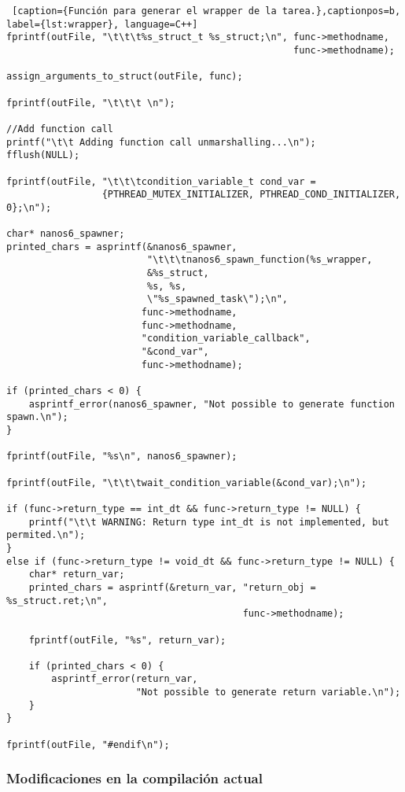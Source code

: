 \begin{lstlisting} [caption={Función para generar el wrapper de la tarea.},captionpos=b, label={lst:wrapper}, language=C++]
fprintf(outFile, "\t\t\t%s_struct_t %s_struct;\n", func->methodname, 
				 								   func->methodname);

assign_arguments_to_struct(outFile, func);

fprintf(outFile, "\t\t\t \n");

//Add function call
printf("\t\t Adding function call unmarshalling...\n");
fflush(NULL);

fprintf(outFile, "\t\t\tcondition_variable_t cond_var = 
				 {PTHREAD_MUTEX_INITIALIZER, PTHREAD_COND_INITIALIZER, 0};\n");

char* nanos6_spawner;
printed_chars = asprintf(&nanos6_spawner, 
						 "\t\t\tnanos6_spawn_function(%s_wrapper,
						 &%s_struct, 
						 %s, %s, 
						 \"%s_spawned_task\");\n",
						func->methodname, 
						func->methodname, 
						"condition_variable_callback", 
						"&cond_var", 
						func->methodname);

if (printed_chars < 0) {
	asprintf_error(nanos6_spawner, "Not possible to generate function spawn.\n");
}

fprintf(outFile, "%s\n", nanos6_spawner);

fprintf(outFile, "\t\t\twait_condition_variable(&cond_var);\n");

if (func->return_type == int_dt && func->return_type != NULL) {
	printf("\t\t WARNING: Return type int_dt is not implemented, but permited.\n");
}
else if (func->return_type != void_dt && func->return_type != NULL) {
	char* return_var;
	printed_chars = asprintf(&return_var, "return_obj = %s_struct.ret;\n", 
										  func->methodname);
	
	fprintf(outFile, "%s", return_var);
	
	if (printed_chars < 0) {
		asprintf_error(return_var, 
					   "Not possible to generate return variable.\n");
	}
}

fprintf(outFile, "#endif\n");
\end{lstlisting}


\subsubsection{Modificaciones en la compilación actual}

